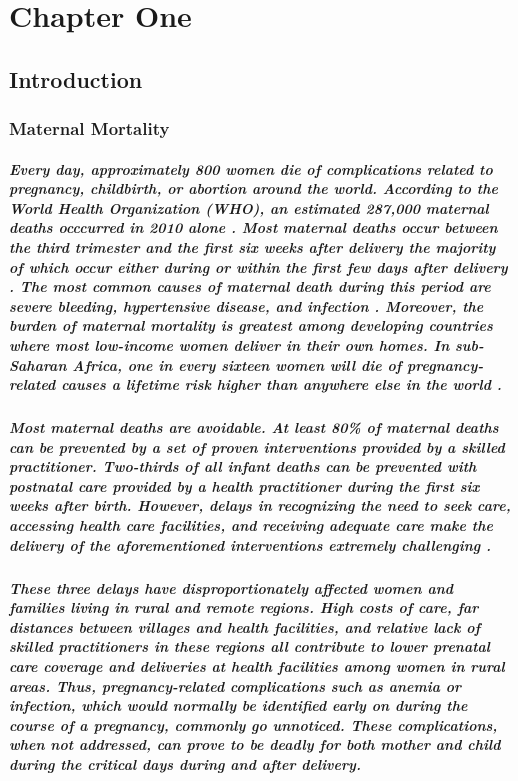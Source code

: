 \chapter{Chapter One}
\section{Introduction}
\subsection{Maternal Mortality}
\paragraph{Every day, approximately 800 women die of complications related to pregnancy, childbirth, or abortion around the world. According to the World Health Organization (WHO), an estimated 287,000 maternal deaths occcurred in 2010 alone \citep{WHO2012}. Most maternal deaths occur between the third trimester and the first six weeks after delivery \textemdash  the majority of which occur either during or within the first few days after delivery \citep{WHO2012}. The most common causes of maternal death during this period are severe bleeding, hypertensive disease, and infection \citep{WHO2012}. Moreover, the burden of maternal mortality is greatest among developing countries where most low-income women deliver in their own homes. In sub-Saharan Africa, one in every sixteen women will die of pregnancy-related causes \textemdash   a lifetime risk higher than anywhere else in the world \citep{Ronsmans2006}.}

\paragraph{Most maternal deaths are avoidable. At least 80\% of maternal deaths can be prevented by a set of proven interventions provided by a skilled practitioner. Two-thirds of all infant deaths can be prevented with postnatal care provided by a health practitioner during the first six weeks after birth. However, delays in recognizing the need to seek care, accessing health care facilities, and receiving  adequate care make the delivery of the aforementioned interventions extremely challenging \citep{Thaddeus1994}. }

\paragraph{These three delays have disproportionately affected women and families living in rural and remote regions. High costs of care, far distances between villages and health facilities, and relative lack of skilled practitioners in these regions all contribute to lower prenatal care coverage and deliveries at health facilities among women in rural areas. Thus, pregnancy-related complications such as anemia or infection, which would normally be identified early on during the course of a pregnancy, commonly go unnoticed. These complications, when not addressed, can prove to be deadly for both mother and child during the critical days during and after delivery.}

